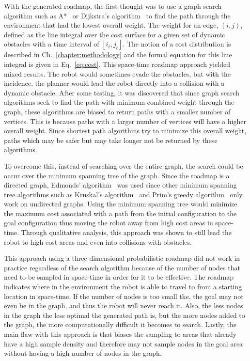 With the generated roadmap, the first thought was to use a graph search
algorithm such as A*~\cite{astar} or Dijkstra's algorithm~\cite{dijkstra} to
find the path through the environment that had the lowest overall weight.  The
weight for an edge, $(i, j)$, defined as the line integral over the cost
surface for a given set of dynamic obstacles with a time interval of $[i_t,
j_t]$.  The notion of a cost distribution is described in
Ch.~\ref{chapter:methodology} and the formal equation for this line integral is
given in Eq.~\ref{eq:cost}.  This space-time roadmap approach yielded mixed
results.  The robot would sometimes evade the obstacles, but with the
incidence, the planner would lead the robot directly into a collision with a
dynamic obstacle. After some testing, it was discovered that since graph search
algorithms seek to find the path with minimum combined weight through the
graph, these algorithms are biased to return paths with a smaller number of
vertices.  This is because paths with a larger number of vertices will have a
higher overall weight. Since shortest path algorithms try to minimize this
overall weight, paths which may be safer but may take longer not be returned by
these algorithms.

To overcome this, instead of searching over the entire graph, the search could
be occur over the minimum spanning tree of the graph.  Since the roadmap is a
directed graph, Edmonds' algorithm~\cite{edmonds} was used since other minimum
spanning tree algorithms such as Kruskal's algorithm~\cite{kruskal} and Prim's
greedy algorithm~\cite{prim} only work on undirected graphs. Using the minimum
spanning tree would minimize the maximum cost associated with a path from the
initial configuration to the goal configuration thus moving the robot away from
high cost areas in space-time. Through qualitative analysis, this approach was
shown to still lead the robot to high cost areas and even into collisions with
obstacles.

This approach using a three dimensional probabilistic roadmap did not work in
practice regardless of the search algorithm because of the number of nodes that
need to be sampled in space-time in order for it to be effective.  The roadmap
indicates where in the environment the robot is able to travel to from a
starting location in space-time. If the number of nodes is too small the, the
goal may not even be in the graph, and thus the robot will never reach it.
Also, the less nodes in the graph the less optimal the generated path is, but
the more nodes added to the graph, the more computationally difficult it
becomes to search. Lastly, the main flaw with this approach is that biases the
sampling to areas that already have a high sample density and therefore may not
sample nodes in the goal area without having a high number of nodes in the
graph.

